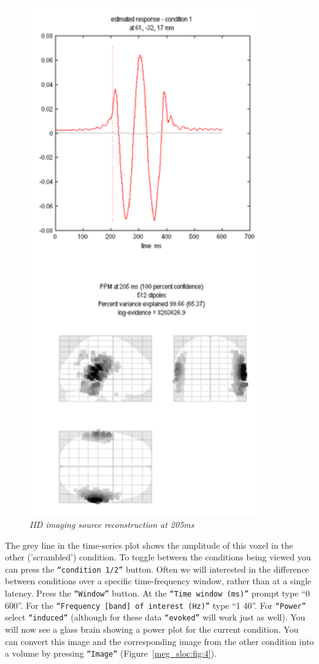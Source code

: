 \begin{figure}
\begin{center}
\includegraphics[width=100mm]{meg_sloc/Slide3}
\caption{\em IID imaging source reconstruction at 205ms \label{meg_sloc:fig:3}}
\end{center}
\end{figure}

The grey line in the time-series plot shows the amplitude of this voxel in the other ('scrambled') condition. To toggle between the conditions being viewed you can press the \texttt{``condition 1/2''} button.
Often we will interested in the difference between conditions over a specific time-frequency window, rather than at a single latency. Press the \texttt{``Window''} button. At the \texttt{``Time window (ms)''} prompt type ``0 600''. For the \texttt{``Frequency [band] of interest (Hz)''} type ``1 40''. For \texttt{``Power''} select \texttt{``induced''} (although for these data \texttt{``evoked''} will work just as well). You will now see a glass brain showing a power plot for the current condition. You can convert this image and the corresponding image from the other condition into a volume by pressing \texttt{``Image''} (Figure~\ref{meg_sloc:fig:4}).

